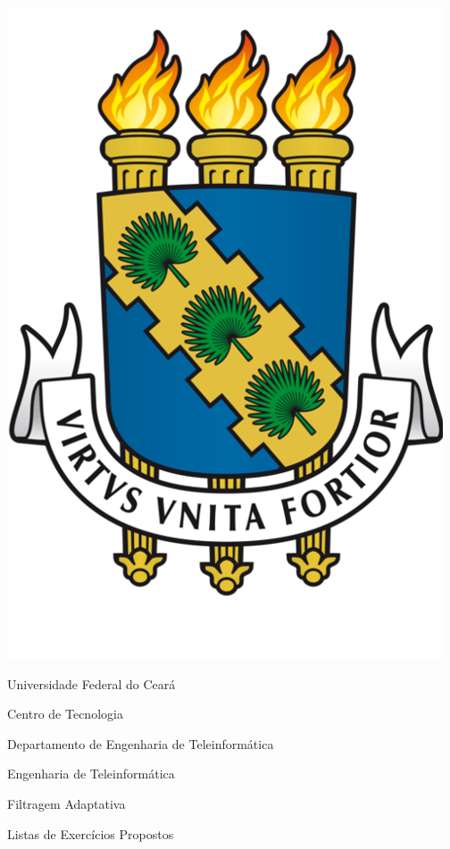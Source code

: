 \thispagestyle{empty}

\begin{center}
  
    \includegraphics[scale=0.10]{figs/icon.png}
    
    \LARGE{Universidade Federal do Ceará}
    
    \LARGE{Centro de Tecnologia}
    
    \LARGE{Departamento de Engenharia de Teleinformática}
    
    \LARGE{Engenharia de Teleinformática}
    
    \vspace{180pt}
      
    \LARGE{Filtragem Adaptativa}
      
    \LARGE{Listas de Exercícios Propostos}
      
    \vspace{100pt}
    
\end{center}

